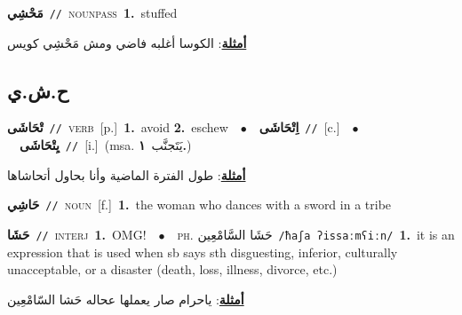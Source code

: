 \documentclass[10pt,a4paper,twoside]{article} %
\begin{document}
\begin{multicols}{2}
{\setlength\topsep{0pt}\textbf{\foreignlanguage{arabic}{مَحْشِي}}\ {\color{gray}\texttt{//}\color{black}}\ \textsc{noun\textunderscore pass}\ \textbf{1.}~stuffed\  \begin{flushright}\color{gray}\foreignlanguage{arabic}{\textbf{\underline{\foreignlanguage{arabic}{أمثلة}}}: الكوسا أغلبه فاضي ومش مَحْشِي كويس}\end{flushright}\color{black}} \vspace{2mm}

\vspace{-3mm}
\subsection*{\color{blue}\foreignlanguage{arabic}{ح.ش.ي}\color{blue}{}} 

{\setlength\topsep{0pt}\textbf{\foreignlanguage{arabic}{تْحَاشَى}}\ {\color{gray}\texttt{//}\color{black}}\ \textsc{verb}\ [p.]\ \textbf{1.}~avoid  \textbf{2.}~eschew\ \ $\bullet$\ \ \setlength\topsep{0pt}\textbf{\foreignlanguage{arabic}{اِتْحَاشَى}}\ {\color{gray}\texttt{//}\color{black}}\ [c.]\ \ $\bullet$\ \ \setlength\topsep{0pt}\textbf{\foreignlanguage{arabic}{يِتْحَاشَى}}\ {\color{gray}\texttt{//}\color{black}}\ [i.]\ \color{gray}(msa. \foreignlanguage{arabic}{يَتَجنَّب}~\foreignlanguage{arabic}{\textbf{١.}})\color{black}\  \begin{flushright}\color{gray}\foreignlanguage{arabic}{\textbf{\underline{\foreignlanguage{arabic}{أمثلة}}}: طول الفترة الماضية وأنا بحاول أتحاشاها}\end{flushright}\color{black}} \vspace{2mm}

{\setlength\topsep{0pt}\textbf{\foreignlanguage{arabic}{حَاشِي}}\ {\color{gray}\texttt{//}\color{black}}\ \textsc{noun}\ [f.]\ \textbf{1.}~the woman who dances with a sword in a tribe\ } \vspace{2mm}

{\setlength\topsep{0pt}\textbf{\foreignlanguage{arabic}{حَشَا}}\ {\color{gray}\texttt{//}\color{black}}\ \textsc{interj}\ \textbf{1.}~OMG!\ \ $\bullet$\ \ \textsc{ph.} \color{gray} \foreignlanguage{arabic}{حَشَا السَّامْعِين}\color{black}\ {\color{gray}\texttt{/{\sffamily ħaʃa ʔissaːmʕiːn}/}\color{black}}\ \textbf{1.}~it is an expression that is used when sb says sth disguesting, inferior, culturally unacceptable, or a disaster (death, loss, illness, divorce, etc.)\  \begin{flushright}\color{gray}\foreignlanguage{arabic}{\textbf{\underline{\foreignlanguage{arabic}{أمثلة}}}: ياحرام صار يعملها عحاله حَشا السّامْعِين}\end{flushright}\color{black}} \vspace{2mm}


\end{multicols}
\end{document}
